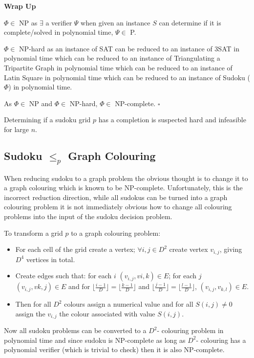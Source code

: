 \documentclass[a4paper,11pt]{report}
\newcounter{col}
\begin{document}
\textbf{Wrap Up} 

$\Phi\in $ NP as $\exists$ a verifier $\Psi$ when given an instance $S$ can determine if it is complete/solved in polynomial time, $\Psi\in$ P.

$\Phi\in $ NP-hard as an instance of SAT can be reduced to an instance of 3SAT in polynomial time which can be reduced to an instance of Triangulating a Tripartite Graph in polynomial time which can be reduced to an instance of Latin Square in polynomial time which can be reduced to an instance of Sudoku ($\Phi$) in polynomial time.

As $\Phi\in$ NP and $\Phi\in$ NP-hard, $\Phi\in$ NP-complete. $\square$

Determining if a sudoku grid $p$ has a completion is suspected hard and infeasible for large $n$.

\subsection{Sudoku $\leq_p$ Graph Colouring}

When reducing sudoku to a graph problem the obvious thought is to change it to a graph colouring which is known to be NP-complete. Unfortunately, this is the incorrect reduction direction, while all sudokus can be turned into a graph colouring problem it is not immediately obvious how to change all colouring problems into the input of the sudoku decision problem. 

To transform a grid $p$ to a graph colouring problem:
\begin{itemize}
\item For each cell of the grid create a vertex; $\forall i,j\in D^2$ create vertex $v_{i,j}$, giving $D^4$ vertices in total.
\item Create edges such that: for each $i$ $(v_{i,j},v{i,k})\in E$; for each $j$ $(v_{i,j},v{k,j})\in E$ and for $\lfloor\frac{i-1}{D}\rfloor=\lfloor\frac{k-1}{D}\rfloor$ and $\lfloor\frac{j-1}{D}\rfloor=\lfloor\frac{l-1}{D}\rfloor$, $(v_{i,j},v_{k,l})\in E$.
\item Then for all $D^2$ colours assign a numerical value and for all $S(i,j)\neq 0$ assign the $v_{i,j}$ the colour associated with value $S(i,j)$.
\end{itemize}

Now all sudoku problems can be converted to a $D^2$- colouring problem in polynomial time and since sudoku is NP-complete as long as $D^2$- colouring has a polynomial verifier (which is trivial to check) then it is also NP-complete. 
\end{document}
